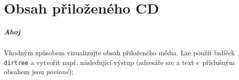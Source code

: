 \documentclass[thesis=M,czech]{FITthesis}[2012/10/20]
\begin{document}

\chapter{Obsah přiloženého CD}

\paragraph{Ahoj} \cite{sitova-karta-s-fpga-xilinx}

Vhodným způsobem vizualizujte obsah přiloženého média. Lze použít balíček \verb|dirtree| a vytvořit např. následující výstup (adresáře src a text s~příslušným obsahem jsou \emph{povinné}):

\begin{figure}
\end{figure}
\end{document}
